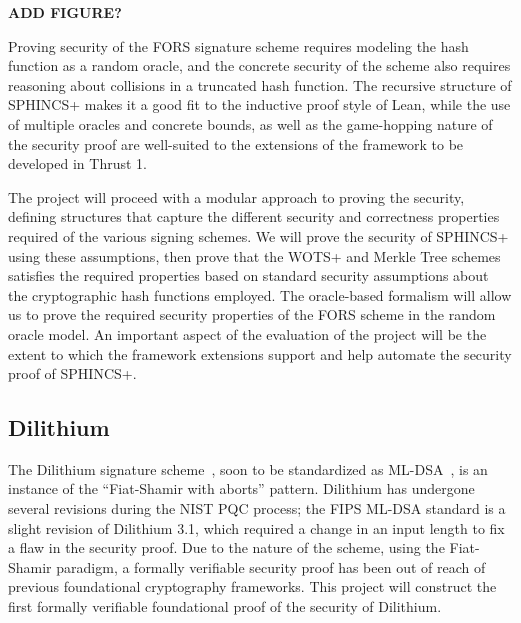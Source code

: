 \textbf{ADD FIGURE?}

Proving security of the FORS signature scheme requires modeling the hash function as a random oracle, and the concrete security of the scheme also requires reasoning about collisions in a truncated hash function.  The recursive structure of SPHINCS+ makes it a good fit to the inductive proof style of Lean, while the use of multiple oracles and concrete bounds, as well as the game-hopping nature of the security proof are well-suited to the extensions of the \vcvio framework to be developed in Thrust 1.

The project will proceed with a modular approach to proving the security, defining  structures that capture the different security and correctness properties required of the various signing schemes.
We will prove the security of SPHINCS+ using these assumptions, then prove that the WOTS+ and Merkle Tree schemes satisfies the required properties based on standard security assumptions about the cryptographic hash functions employed.
The \vcvio oracle-based formalism will allow us to prove the required security properties of the FORS scheme in the random oracle model.
An important aspect of the evaluation of the project will be the extent to which the \vcvio framework extensions support and help automate the security proof of SPHINCS+.


\subsection{Dilithium}

The Dilithium signature scheme~\cite{dilithum}, soon to be standardized as ML-DSA~\cite{ML-DSA}, is an instance of the ``Fiat-Shamir with aborts'' pattern.
Dilithium has undergone several revisions during the NIST PQC process; the FIPS ML-DSA standard is a slight revision of Dilithium 3.1, which required a change in an input length to fix a flaw in the security proof.
Due to the nature of the scheme, using the  Fiat-Shamir paradigm, a formally verifiable security proof has been out of reach of previous foundational cryptography frameworks.
This project will construct the first formally verifiable foundational proof of the security of Dilithium.

